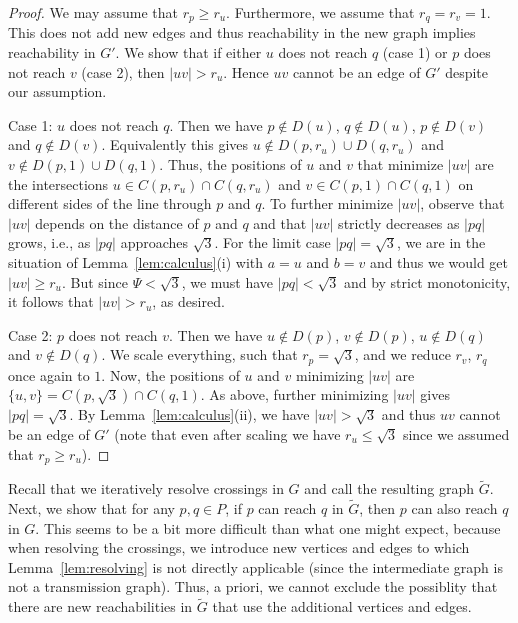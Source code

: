 \documentclass[11pt,a4paper]{paper}
\begin{document}
\begin{proof}
We may assume that $r_p \geq r_u$. Furthermore, we assume that 
$r_q = r_v = 1$. This does
not add new edges and thus reachability in the new graph
implies reachability in $G'$.
We show that if either $u$ does not reach $q$ (case 1)
or $p$ does not reach $v$ (case 2), then $|uv| > r_u$. Hence
$uv$ cannot be an edge of $G'$ despite our assumption.

Case 1: $u$ does not reach $q$.
Then we have $p \notin D(u)$, $q \notin D(u)$, $p \notin D(v)$
and $q \notin D(v)$.
Equivalently this gives $u \notin D(p,r_u) \cup D(q,r_u)$
and $ v \notin D(p,1) \cup D(q,1)$.
Thus, the positions of $u$ and $v$ that minimize $|uv|$
are the intersections $u \in C(p,r_u) \cap C(q,r_u)$
and $v \in C(p,1) \cap C(q,1)$ on different sides of
the line through $p$ and $q$.
To further  minimize $|uv|$, observe that $|uv|$ depends on the distance
of $p$ and $q$ and that $|uv|$ strictly decreases as $|pq|$ grows, i.e.,
as $|pq|$ approaches $\sqrt{3}$.
For the limit case $|pq| = \sqrt{3}$, we are in the situation
of Lemma~\ref{lem:calculus}(i) with $a=u$ and $b=v$
and thus we would get $|uv| \geq r_u$.
But since $\Psi < \sqrt{3}$, we must have $|pq| < \sqrt{3}$ and by
strict monotonicity, it follows that $|uv| > r_u$,
as desired.

Case 2: $p$ does not reach $v$. Then we have
$u \notin D(p)$, $v \notin D(p)$, $u \notin D(q)$ and $v \notin D(q)$.
We scale everything, such that $r_p = \sqrt{3}$, and we reduce
$r_v$, $r_q$ once again to $1$.
Now, the positions of $u$ and $v$ minimizing $|uv|$ are
$\{u,v\} = C(p,\sqrt{3}) \cap C(q,1)$. As above,
further minimizing $|uv|$ gives $|pq| = \sqrt{3}$.
By Lemma~\ref{lem:calculus}(ii), we have $|uv| > \sqrt{3}$ and
thus $uv$ cannot be an edge of $G'$ (note that even after scaling we have
$r_u \leq \sqrt{3}$ since we assumed that $r_p \ge r_u$).
\end{proof}

Recall that we iteratively resolve crossings in $G$ and call the resulting graph
$\widetilde{G}$. Next, we show that for any $p, q \in P$, if $p$ can
reach $q$ in $\widetilde{G}$, then $p$ can also reach $q$ in $G$.
This seems to be a bit more difficult than what one might expect, because
when resolving the crossings, we introduce new vertices and edges
to which Lemma~\ref{lem:resolving} is not directly applicable 
(since the intermediate graph is not a transmission graph). Thus, 
a priori, we cannot exclude the possiblity that there are new 
reachabilities in $\widetilde{G}$ that use the additional 
vertices and edges.
\end{document}
